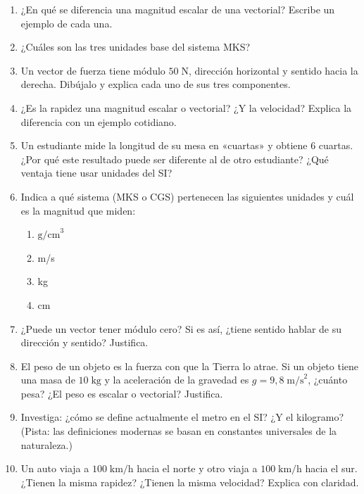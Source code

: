 \documentclass[12pt, letterpaper]{article}
\begin{document}
\begin{enumerate}[leftmargin=*]
  \item \facil{} ¿En qué se diferencia una magnitud escalar de una vectorial? Escribe un ejemplo de cada una.

  \item \facil{} ¿Cuáles son las tres unidades base del sistema MKS?

  \item \medio{} Un vector de fuerza tiene módulo $50\;\text{N}$, dirección horizontal y sentido hacia la derecha. Dibújalo y explica cada uno de sus tres componentes.

  \item \medio{} ¿Es la rapidez una magnitud escalar o vectorial? ¿Y la velocidad? Explica la diferencia con un ejemplo cotidiano.

  \item \medio{} Un estudiante mide la longitud de su mesa en «cuartas» y obtiene 6 cuartas. ¿Por qué este resultado puede ser diferente al de otro estudiante? ¿Qué ventaja tiene usar unidades del SI?

  \item \medio{} Indica a qué sistema (MKS o CGS) pertenecen las siguientes unidades y cuál es la magnitud que miden:
        \begin{enumerate}[label=\alph*)]
          \item $\text{g/cm}^3$
          \item m/s
          \item kg
          \item cm
        \end{enumerate}

  \item \dificil{} ¿Puede un vector tener módulo cero? Si es así, ¿tiene sentido hablar de su dirección y sentido? Justifica.

  \item \dificil{} El peso de un objeto es la fuerza con que la Tierra lo atrae. Si un objeto tiene una masa de $10\;\text{kg}$ y la aceleración de la gravedad es $g = 9{,}8\;\text{m/s}^2$, ¿cuánto pesa? ¿El peso es escalar o vectorial? Justifica.

  \item \dificil{} Investiga: ¿cómo se define actualmente el metro en el SI? ¿Y el kilogramo? (Pista: las definiciones modernas se basan en constantes universales de la naturaleza.)

  \item \dificil{} Un auto viaja a $100\;\text{km/h}$ hacia el norte y otro viaja a $100\;\text{km/h}$ hacia el sur. ¿Tienen la misma rapidez? ¿Tienen la misma velocidad? Explica con claridad.
\end{enumerate}
\end{document}

